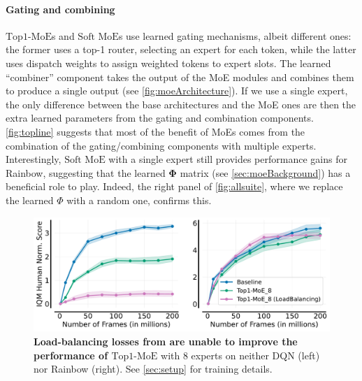 \documentclass{article}
\theoremstyle{plain}
\theoremstyle{definition}
\theoremstyle{remark}
\newcommand{\moe}{$\textrm{Top1-MoE}$}
\newcommand{\softmoe}{$\textrm{Soft MoE}$}
\begin{document}
\paragraph{Gating and combining} \moe{}s and \softmoe{}s use learned gating mechanisms, albeit different ones: the former uses a top-1 router, selecting an expert for each token, while the latter uses dispatch weights to assign weighted tokens to expert slots. The learned ``combiner'' component takes the output of the MoE modules and combines them to produce a single output (see \cref{fig:moeArchitecture}).  If we use a single expert, the only difference between the base architectures and the MoE ones are then the extra learned parameters from the gating and combination components. \cref{fig:topline} suggests that most of the benefit of MoEs comes from the combination of the gating/combining components with multiple experts. Interestingly, \softmoe{} with a single expert still provides performance gains for Rainbow, suggesting that the learned $\boldsymbol{\Phi}$ matrix (see \cref{sec:moeBackground}) has a beneficial role to play. Indeed, the right panel of \cref{fig:allsuite}, where we replace the learned $\Phi$ with a random one, confirms this.

\begin{figure}[!t]
    \centering
    \includegraphics[width=\linewidth]{figures/combinedLoadBalancing.pdf}
    \vspace{-0.4cm}
    \caption{{\bf Load-balancing losses from \citet{ruiz2021scaling} are unable to improve the performance of \moe{}} with 8 experts on neither DQN (left) nor Rainbow (right). See \cref{sec:setup} for training details.}
    \label{fig:combinedLoadBalancing}%
\end{figure}
\end{document}
